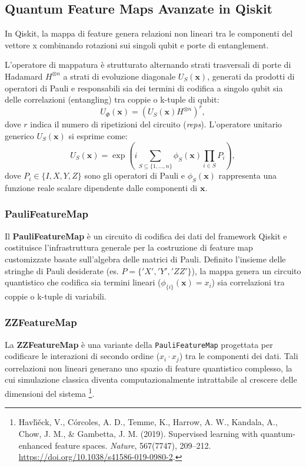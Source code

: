 \subsection{Quantum Feature Maps Avanzate in Qiskit}
In Qiskit, la mappa di feature genera relazioni non lineari tra le componenti del vettore x combinando rotazioni sui singoli qubit e porte di entanglement.

L'operatore di mappatura è strutturato alternando strati trasversali di porte di Hadamard $H^{\otimes n}$ a strati di evoluzione diagonale $U_S(\mathbf{x})$, generati da prodotti di operatori di Pauli e responsabili sia dei termini di codifica a singolo qubit sia delle correlazioni (entangling) tra coppie o k-tuple di qubit:
\begin{equation}
U_{\Phi}(\mathbf{x}) = \left( U_S(\mathbf{x}) H^{\otimes n} \right)^r,
\end{equation}
dove $r$ indica il numero di ripetizioni del circuito (\textit{reps}). L'operatore unitario generico $U_S(\mathbf{x})$ si esprime come:
\begin{equation}
U_S(\mathbf{x}) = \exp\left( i \sum_{S \subseteq \{1, \dots, n\}} \phi_S(\mathbf{x}) \prod_{i \in S} P_i \right),
\end{equation}
dove $P_i \in \{I, X, Y, Z\}$ sono gli operatori di Pauli e $\phi_S(\mathbf{x})$ rappresenta una funzione reale scalare dipendente dalle componenti di $\mathbf{x}$.

\subsubsection{PauliFeatureMap}
Il \textbf{PauliFeatureMap} è un circuito di codifica dei dati del framework Qiskit e costituisce l'infrastruttura generale per la costruzione di feature map customizzate basate sull'algebra delle matrici di Pauli. Definito l'insieme delle stringhe di Pauli desiderate (es. $P = \{'X', 'Y', 'ZZ'\}$), la mappa genera un circuito quantistico che codifica sia termini lineari ($\phi_{\{i\}}(\mathbf{x}) = x_i$) sia correlazioni tra coppie o k-tuple di variabili.

\subsubsection{ZZFeatureMap}
La \textbf{ZZFeatureMap} è una variante della \texttt{PauliFeatureMap} progettata per codificare le interazioni di secondo ordine ($x_i \cdot x_j$) tra le componenti dei dati. Tali correlazioni non lineari generano uno spazio di feature quantistico complesso, la cui simulazione classica diventa computazionalmente intrattabile al crescere delle dimensioni del sistema \footnote{Havl{\'\i}{\v{e}}ck, V., Córcoles, A. D., Temme, K., Harrow, A. W., Kandala, A., Chow, J. M., \& Gambetta, J. M. (2019). Supervised learning with quantum-enhanced feature spaces. \textit{Nature}, 567(7747), 209--212. \url{https://doi.org/10.1038/s41586-019-0980-2}.}.

